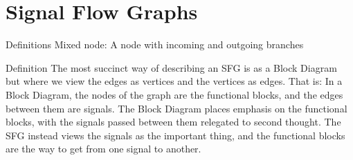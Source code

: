 \documentclass{../templates/topic}
\begin{document}
\chapter{Signal Flow Graphs}


\begin{section}{Definitions}
	Mixed node: A node with incoming and outgoing branches
\end{section}

\begin{section}{Definition}
	The most succinct way of describing an SFG is as a Block Diagram but where we view the edges as vertices and the vertices as edges. That is: In a Block Diagram, the nodes of the graph are the functional blocks, and the edges between them are signals. The Block Diagram places emphasis on the functional blocks, with the signals passed between them relegated to second thought. The SFG instead views the signals as the important thing, and the functional blocks are the way to get from one signal to another.


\end{section}
\end{document}
